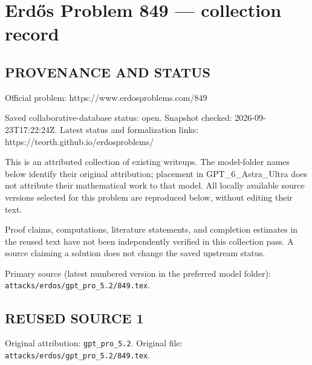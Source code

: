 \section*{Erd\H{o}s Problem 849 --- collection record}

\subsection*{PROVENANCE AND STATUS}
Official problem: https://www.erdosproblems.com/849

Saved collaborative-database status: open.
Snapshot checked: 2026-09-23T17:22:24Z.
Latest status and formalization links: https://teorth.github.io/erdosproblems/

This is an attributed collection of existing writeups. The model-folder names below identify their original attribution; placement in GPT\_6\_Astra\_Ultra does not attribute their mathematical work to that model. All locally available source versions selected for this problem are reproduced below, without editing their text.

Proof claims, computations, literature statements, and completion estimates in the reused text have not been independently verified in this collection pass. A source claiming a solution does not change the saved upstream status.

Primary source (latest numbered version in the preferred model folder): \texttt{attacks/erdos/gpt\_pro\_5.2/849.tex}.

\subsection*{REUSED SOURCE 1}
Original attribution: \texttt{gpt\_pro\_5.2}.
Original file: \texttt{attacks/erdos/gpt\_pro\_5.2/849.tex}.


